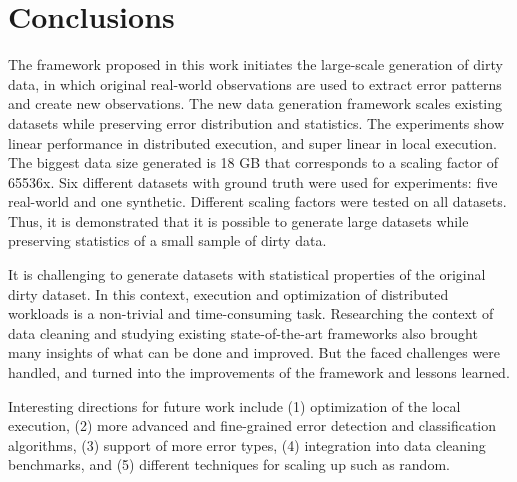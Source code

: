 \chapter{Conclusions}
The framework proposed in this work initiates the large-scale generation of dirty data, in which original real-world observations are used to extract error patterns and create new observations.
The new data generation framework scales existing datasets while preserving error distribution and statistics.
The experiments show linear performance in distributed execution, and super linear in local execution.
The biggest data size generated is 18 GB that corresponds to a scaling factor of 65536x.
Six different datasets with ground truth were used for experiments: five real-world and one synthetic.
Different scaling factors were tested on all datasets.
Thus, it is demonstrated that it is possible to generate large datasets while preserving statistics of a small sample of dirty data.

It is challenging to generate datasets with statistical properties of the original dirty dataset.
In this context, execution and optimization of distributed workloads is a non-trivial and time-consuming task.
Researching the context of data cleaning and studying existing state-of-the-art frameworks also brought many insights of what can be done and improved.
But the faced challenges were handled, and turned into the improvements of the framework and lessons learned.

Interesting directions for future work include 
(1) optimization of the local execution, 
(2) more advanced and fine-grained error detection and classification algorithms,
(3) support of more error types, 
(4) integration into data cleaning benchmarks, and
(5) different techniques for scaling up such as random.


